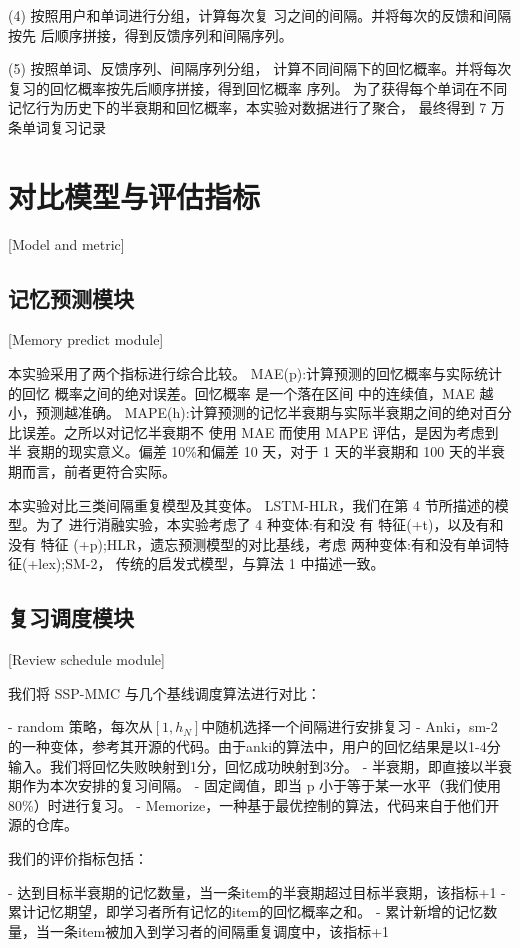 (4) 按照用户和单词进行分组，计算每次复 习之间的间隔。并将每次的反馈和间隔按先 后顺序拼接，得到反馈序列和间隔序列。

(5) 按照单词、反馈序列、间隔序列分组， 计算不同间隔下的回忆概率。并将每次复习的回忆概率按先后顺序拼接，得到回忆概率 序列。 为了获得每个单词在不同记忆行为历史下的半衰期和回忆概率，本实验对数据进行了聚合， 最终得到 7 万条单词复习记录

\section{对比模型与评估指标}[Model and metric]

\subsection{记忆预测模块}[Memory predict module]

本实验采用了两个指标进行综合比较。 MAE(p):计算预测的回忆概率与实际统计的回忆 概率之间的绝对误差。回忆概率 是一个落在区间 中的连续值，MAE 越小，预测越准确。 MAPE(h):计算预测的记忆半衰期与实际半衰期之间的绝对百分比误差。之所以对记忆半衰期不 使用 MAE 而使用 MAPE 评估，是因为考虑到半 衰期的现实意义。偏差 10\%和偏差 10 天，对于 1 天的半衰期和 100 天的半衰期而言，前者更符合实际。

本实验对比三类间隔重复模型及其变体。 LSTM-HLR，我们在第 4 节所描述的模型。为了 进行消融实验，本实验考虑了 4 种变体:有和没 有 特征(+t)，以及有和没有 特征 (+p);HLR，遗忘预测模型的对比基线，考虑 两种变体:有和没有单词特征(+lex);SM-2， 传统的启发式模型，与算法 1 中描述一致。

\subsection{复习调度模块}[Review schedule module]

我们将 SSP-MMC 与几个基线调度算法进行对比：

- random 策略，每次从$[1,h_N]$中随机选择一个间隔进行安排复习
- Anki，sm-2 的一种变体，参考其开源的代码。由于anki的算法中，用户的回忆结果是以1-4分输入。我们将回忆失败映射到1分，回忆成功映射到3分。
- 半衰期，即直接以半衰期作为本次安排的复习间隔。
- 固定阈值，即当 p 小于等于某一水平（我们使用80\%）时进行复习。
- Memorize，一种基于最优控制的算法，代码来自于他们开源的仓库。

我们的评价指标包括：

- 达到目标半衰期的记忆数量，当一条item的半衰期超过目标半衰期，该指标+1
- 累计记忆期望，即学习者所有记忆的item的回忆概率之和。
- 累计新增的记忆数量，当一条item被加入到学习者的间隔重复调度中，该指标+1

